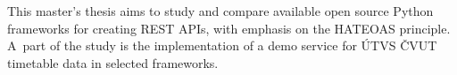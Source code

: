 This master's thesis aims to study and compare available open source Python frameworks for creating REST APIs, with emphasis on the HATEOAS principle. A~part of the study is the implementation of a demo service for ÚTVS ČVUT timetable data in selected frameworks.
